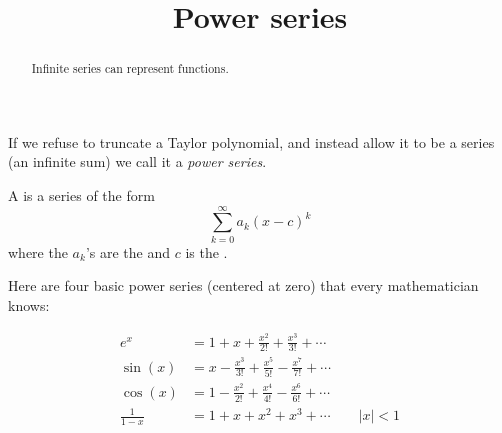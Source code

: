 \documentclass{ximera}
\title[Dig-In:]{Power series}
\begin{document}
\begin{abstract}
  Infinite series can represent functions.
\end{abstract}
\maketitle

If we refuse to truncate a Taylor polynomial, and instead allow it to
be a series (an infinite sum) we call it a \textit{power series}. 

\begin{definition}
  A  is a series of the form
  \[
  \sum_{k=0}^\infty a_k(x-c)^k
  \]
  where the $a_k$'s are the  and $c$ is the
  .
\end{definition}

Here are four basic power series (centered at zero) that every
mathematician knows:

\begin{align*}
           e^x &= 1 + x + \frac{x^2}{2!} + \frac{x^3}{3!} + \cdots\\
       \sin(x) &= x - \frac{x^3}{3!} + \frac{x^5}{5!} -\frac{x^7}{7!} + \cdots\\
       \cos(x) &= 1-\frac{x^2}{2!} + \frac{x^4}{4!} -\frac{x^6}{6!} + \cdots\\
 \frac{1}{1-x} &= 1+ x+ x^2 + x^3 + \cdots \qquad |x|< 1
\end{align*}
\end{document}
